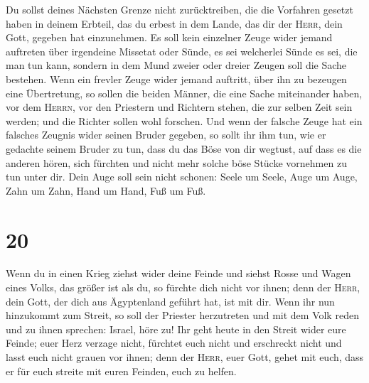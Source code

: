  Du sollst deines Nächsten Grenze nicht zurücktreiben,
die die Vorfahren gesetzt haben in deinem Erbteil, das du erbest in dem
Lande, das dir der \textsc{Herr}, dein Gott, gegeben hat einzunehmen.
 Es soll kein einzelner Zeuge wider jemand auftreten über
irgendeine Missetat oder Sünde, es sei welcherlei Sünde es sei, die man
tun kann, sondern in dem Mund zweier oder dreier Zeugen soll die Sache
bestehen.  Wenn ein frevler Zeuge wider jemand auftritt,
über ihn zu bezeugen eine Übertretung,  so sollen die
beiden Männer, die eine Sache miteinander haben, vor dem \textsc{Herrn},
vor den Priestern und Richtern stehen, die zur selben Zeit sein werden;
 und die Richter sollen wohl forschen. Und wenn der
falsche Zeuge hat ein falsches Zeugnis wider seinen Bruder gegeben,
 so sollt ihr ihm tun, wie er gedachte seinem Bruder zu
tun, dass du das Böse von dir wegtust,  auf dass es die
anderen hören, sich fürchten und nicht mehr solche böse Stücke vornehmen
zu tun unter dir.  Dein Auge soll sein nicht schonen:
Seele um Seele, Auge um Auge, Zahn um Zahn, Hand um Hand, Fuß um Fuß.

\hypertarget{section-19}{%
\section{20}\label{section-19}}

 Wenn du in einen Krieg ziehst wider deine Feinde und
siehst Rosse und Wagen eines Volks, das größer ist als du, so fürchte
dich nicht vor ihnen; denn der \textsc{Herr}, dein Gott, der dich aus
Ägyptenland geführt hat, ist mit dir.  Wenn ihr nun
hinzukommt zum Streit, so soll der Priester herzutreten und mit dem Volk
reden  und zu ihnen sprechen: Israel, höre zu! Ihr geht
heute in den Streit wider eure Feinde; euer Herz verzage nicht, fürchtet
euch nicht und erschreckt nicht und lasst euch nicht grauen vor ihnen;
 denn der \textsc{Herr}, euer Gott, gehet mit euch, dass
er für euch streite mit euren Feinden, euch zu helfen.


